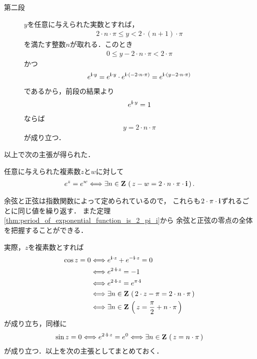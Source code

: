 \begin{sketch}
\begin{description}
			\item[第二段]
				$y$を任意に与えられた実数とすれば，
				\begin{align}
					2 \cdot n \cdot \pi \leq y < 2 \cdot (n+1) \cdot \pi
				\end{align}
				を満たす整数$n$が取れる．このとき
				\begin{align}
					0 \leq y - 2 \cdot n \cdot \pi < 2 \cdot \pi
				\end{align}
				かつ
				\begin{align}
					e^{\mathbf{i} \cdot y}
					= e^{\mathbf{i} \cdot y} \cdot e^{\mathbf{i} \cdot (- 2 \cdot n \cdot \pi)}
					= e^{\mathbf{i} \cdot (y - 2 \cdot n \cdot \pi)}
				\end{align}
				であるから，前段の結果より
				\begin{align}
					e^{\mathbf{i} \cdot y} = 1
				\end{align}
				ならば
				\begin{align}
					y = 2 \cdot n \cdot \pi
				\end{align}
				が成り立つ．
				\QED
		\end{description}
	\end{sketch}
	
	以上で次の主張が得られた．
	\begin{screen}
		\begin{thm}
		\label{thm:period_of_exponential_function_is_2_pi_i}
			任意に与えられた複素数$z$と$w$に対して
			\begin{align}
				e^{z} = e^{w} \Longleftrightarrow 
				\exists n \in \mathbf{Z}\, \left(\, z - w = 2 \cdot n \cdot \pi \cdot \mathbf{i}\, \right).
			\end{align}
		\end{thm}
	\end{screen}
	
	余弦と正弦は指数関数によって定められているので，
	これらも$2 \cdot \pi \cdot \mathbf{i}$ずれるごとに同じ値を繰り返す．
	また定理\ref{thm:period_of_exponential_function_is_2_pi_i}から
	余弦と正弦の零点の全体を把握することができる．
	
	実際，$z$を複素数とすれば
	\begin{align}
		\cos{z} = 0 
		&\Longleftrightarrow e^{\mathbf{i} \cdot z} + e^{-\mathbf{i} \cdot z} = 0 \\
		&\Longleftrightarrow e^{2 \cdot \mathbf{i} \cdot z} = -1 \\
		&\Longleftrightarrow e^{2 \cdot \mathbf{i} \cdot z} = e^{\pi \cdot \mathbf{i}} \\
		&\Longleftrightarrow \exists n \in \mathbf{Z}\,
		\left(\, 2 \cdot z - \pi = 2 \cdot n \cdot \pi\, \right) \\
		&\Longleftrightarrow \exists n \in \mathbf{Z}\,
		\left(\, z = \frac{\pi}{2} + n \cdot \pi\, \right)
	\end{align}
	が成り立ち，同様に
	\begin{align}
		\sin{z} = 0
		\Longleftrightarrow e^{2 \cdot \mathbf{i} \cdot z} = e^{0}
		\Longleftrightarrow \exists n \in \mathbf{Z}\, \left(\, z = n \cdot \pi\, \right)
	\end{align}
	が成り立つ．以上を次の主張としてまとめておく．
	
